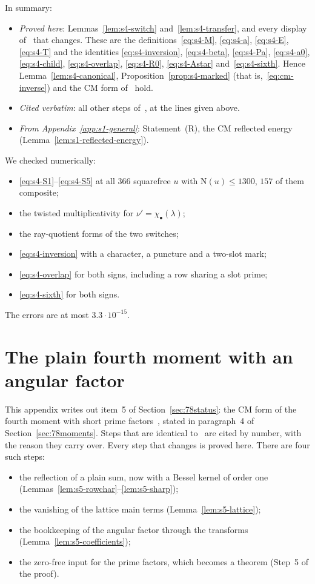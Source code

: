 \documentclass[11pt]{article}
\numberwithin{equation}{section}
\newcommand{\N}{\mathrm N}
\begin{document}
In summary:
\begin{itemize}
\item \emph{Proved here}: Lemmas~\ref{lem:s4-switch} and~\ref{lem:s4-transfer}, and every display of~\cite{OAI78}
 that changes. These are the definitions~\eqref{eq:s4-M}, \eqref{eq:s4-a}, \eqref{eq:s4-E}, \eqref{eq:s4-T}
 and the identities \eqref{eq:s4-inversion}, \eqref{eq:s4-beta}, \eqref{eq:s4-Pa}, \eqref{eq:s4-a0},
 \eqref{eq:s4-child}, \eqref{eq:s4-overlap}, \eqref{eq:s4-R0}, \eqref{eq:s4-Astar} and~\eqref{eq:s4-sixth}.
 Hence Lemma~\ref{lem:s4-canonical}, Proposition~\ref{prop:s4-marked} (that is,~\eqref{eq:cm-inverse}) and the CM
 form of~\cite[Lemma~17.6]{OAI78} hold.
\item \emph{Cited verbatim}: all other steps of~\cite[Section~17]{OAI78}, at the lines given above.
\item \emph{From Appendix~\ref{app:s1-general}}: Statement~(R), the CM reflected energy
 (Lemma~\ref{lem:s1-reflected-energy}).
\end{itemize}
We checked numerically:
\begin{itemize}
\item \eqref{eq:s4-S1}--\eqref{eq:s4-S5} at all $366$ squarefree $u$ with $\N(u)\le1300$, $157$ of them composite;
\item the twisted multiplicativity for $\nu'=\chi_\bullet(\lambda)$;
\item the ray-quotient forms of the two switches;
\item \eqref{eq:s4-inversion} with a character, a puncture and a two-slot mark;
\item \eqref{eq:s4-overlap} for both signs, including a row sharing a slot prime;
\item \eqref{eq:s4-sixth} for both signs.
\end{itemize}
The errors are at most $3.3\cdot10^{-15}$.

\section{The plain fourth moment with an angular factor}\label{app:s5-plain}

This appendix writes out item~5 of Section~\ref{sec:78status}: the CM form of the fourth moment
with short prime factors~\cite[Lemma~18.1]{OAI78}, stated in paragraph~4 of
Section~\ref{sec:78moments}. Steps that are identical to~\cite{OAI78} are cited by number, with the
reason they carry over. Every step that changes is proved here. There are four such
steps:
\begin{itemize}
\item the reflection of a plain sum, now with a Bessel kernel of order one
 (Lemmas~\ref{lem:s5-rowchar}--\ref{lem:s5-sharp});
\item the vanishing of the lattice main terms (Lemma~\ref{lem:s5-lattice});
\item the bookkeeping of the angular factor through the transforms (Lemma~\ref{lem:s5-coefficients});
\item the zero-free input for the prime factors, which becomes a theorem (Step~5 of the proof).
\end{itemize}
\end{document}
